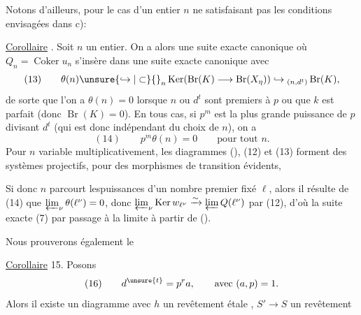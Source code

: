 
Notons d'ailleurs, pour le cas d'un entier $n$ ne satisfaisant pas  les conditions envisagées dans c):

\uline{Corollaire} . Soit $n$ un entier. On a alors une suite exacte canonique
où $Q_n=\operatorname{Coker}u_n$ s'insère dans une suite exacte canonique
avec
\[
(13)\qquad\theta(n)\unsure{\hookrightarrow|\subset}{}_n\operatorname{Ker}(\operatorname{Br}(K)\longrightarrow\operatorname{Br}(X_\eta))\hookrightarrow{}_{(n,d^t)}\operatorname{Br}(K),
\]
de sorte que l'on a $\theta(n)=0$ lorsque $n$ ou $d^t$ sont premiers à $p$ ou que $k$ est parfait (donc $\operatorname{Br}(K)=0$). En tous cas, si $p^m$ est la plus grande puissance de $p$ divisant $d^t$ (qui est donc indépendant du choix de $n$), on a
\[
(14)\qquad p^m\theta(n)=0\qquad\text{pour tout }n.
\]
Pour $n$ variable multiplicativement, les  diagrammes (), (12) et (13) forment des systèmes projectifs, pour des morphismes de transition évidents, 

Si donc $n$ parcourt lespuissances d'un nombre premier fixé $\ell$, alors il résulte de (14) que $\varprojlim_\nu\theta(\ell^\nu)=0$,  donc $\varprojlim_\nu\operatorname{Ker}w_{\ell^\nu}\xrightarrow{\sim}\varprojlim Q(\ell^\nu)$  par (12), d'où la suite exacte (7) par passage à la limite à partir de ().

Nous prouverons également le

\uline{Corollaire} 15. Posons
\[
(16)\qquad d^{\unsure{t}}=p^r a,\qquad\text{avec }(a,p)=1.
\]
Alors il existe un  diagramme
avec $h$ un revêtement étale , $S'\longrightarrow S$ un revêtement


